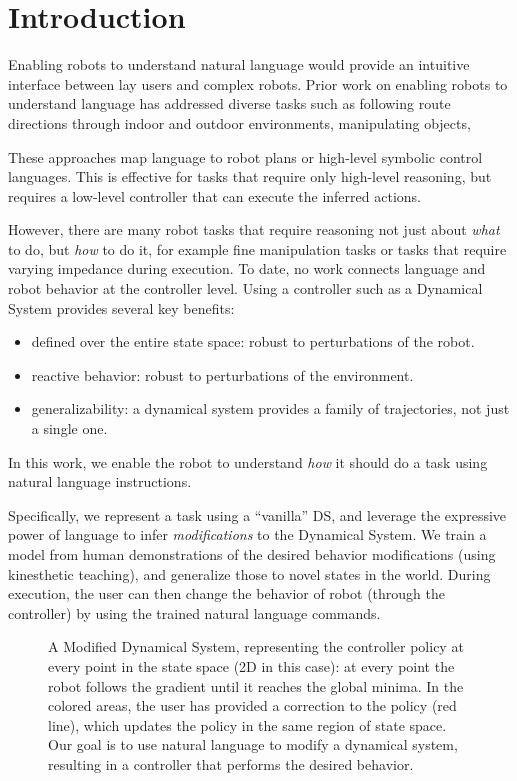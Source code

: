 \section{Introduction}
\label{secIntroduction}


Enabling robots to understand natural language would provide an intuitive interface between lay users and complex robots.
Prior work on enabling robots to understand language has addressed diverse tasks such as following route directions through indoor and outdoor environments, manipulating objects,


These approaches map language to robot plans or high-level symbolic control languages.
This is effective for tasks that require only high-level reasoning, but requires a low-level controller that can execute the inferred actions.

However, there are many robot tasks that require reasoning not just about \emph{what} to do, but \emph{how} to do it, for example fine manipulation tasks or tasks that require varying impedance during execution.
To date, no work connects language and robot behavior at the controller level.
Using a controller such as a Dynamical System provides several key benefits:
\begin{itemize}
\item defined over the entire state space: robust to perturbations of the robot.
\item reactive behavior: robust to perturbations of the environment.
\item generalizability: a dynamical system provides a family of trajectories, not just a single one.
\end{itemize}



In this work, we enable the robot to understand \emph{how} it should do a task using natural language instructions.

Specifically, we represent a task using a ``vanilla'' DS, and leverage the expressive power of language to infer \emph{modifications} to the Dynamical System.
We train a model from human demonstrations of the desired behavior modifications (using kinesthetic teaching), and generalize those to novel states in the world.
During execution, the user can then change the behavior of robot (through the controller) by using the trained natural language commands.



\begin{figure}[t]
  \centering
  \caption{A Modified Dynamical System, representing the controller policy at every point in the state space (2D in this case): at every point the robot follows the gradient until it reaches the global minima.
 In the colored areas, the user has provided a correction to the policy (red line), which updates the policy in the same region of state space.
    Our goal is to use natural language to modify a dynamical system, resulting in a controller that performs the desired behavior.
}
  \label{figProblemSetup}
\end{figure}



